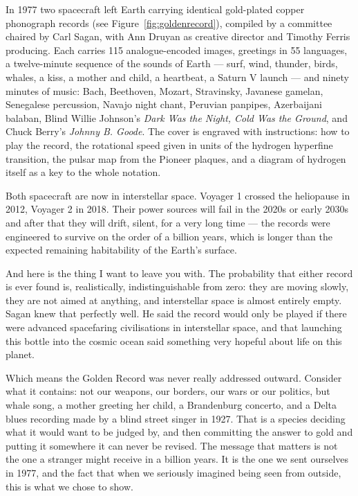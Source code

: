 In 1977 two spacecraft left Earth carrying identical gold-plated copper phonograph records (see Figure~\ref{fig:goldenrecord}),
compiled by a committee chaired by Carl Sagan, with Ann Druyan as creative director and Timothy Ferris
producing. Each carries 115 analogue-encoded images, greetings in 55 languages, a twelve-minute
sequence of the sounds of Earth --- surf, wind, thunder, birds, whales, a kiss, a mother and child, a
heartbeat, a Saturn V launch --- and ninety minutes of music: Bach, Beethoven, Mozart, Stravinsky,
Javanese gamelan, Senegalese percussion, Navajo night chant, Peruvian panpipes, Azerbaijani
balaban, Blind Willie Johnson's \emph{Dark Was the Night, Cold Was the Ground}, and Chuck Berry's
\emph{Johnny B. Goode}. The cover is engraved with instructions: how to play the record, the
rotational speed given in units of the hydrogen hyperfine transition, the pulsar map from the Pioneer
plaques, and a diagram of hydrogen itself as a key to the whole notation.

Both spacecraft are now in interstellar space. Voyager 1 crossed the heliopause in 2012, Voyager 2 in
2018. Their power sources will fail in the 2020s or early 2030s and after that they will drift,
silent, for a very long time --- the records were engineered to survive on the order of a billion
years, which is longer than the expected remaining habitability of the Earth's surface.

And here is the thing I want to leave you with. The probability that either record is ever found is,
realistically, indistinguishable from zero: they are moving slowly, they are not aimed at anything,
and interstellar space is almost entirely empty. Sagan knew that perfectly well. He said the record
would only be played if there were advanced spacefaring civilisations in interstellar space, and that
launching this bottle into the cosmic ocean said something very hopeful about life on this planet.

Which means the Golden Record was never really addressed outward. Consider what it contains: not our
weapons, our borders, our wars or our politics, but whale song, a mother greeting her child, a
Brandenburg concerto, and a Delta blues recording made by a blind street singer in 1927. That is a
species deciding what it would want to be judged by, and then committing the answer to gold and
putting it somewhere it can never be revised. The message that matters is not the one a stranger might
receive in a billion years. It is the one we sent ourselves in 1977, and the fact that when we
seriously imagined being seen from outside, this is what we chose to show.

